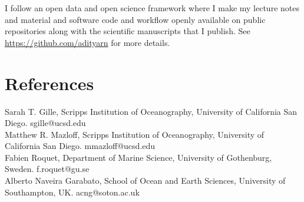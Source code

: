 \documentclass[12pt, a4paper]{article}
\newcommand{\numbers}[1]{\marginnote{\small #1}}
\begin{document}
I follow an open data and open science framework where I make my lecture notes and material and software code and workflow openly available on public repositories along with the scientific manuscripts that I publish. See \url{https://github.com/adityarn} for more details.


\section*{References}

\numbers{■} Sarah T. Gille, Scripps Institution of Oceanography, University of California San Diego. sgille@ucsd.edu\\
\numbers{■} Matthew R. Mazloff, Scripps Institution of Oceanography, University of California San Diego. mmazloff@ucsd.edu\\
\numbers{■} Fabien Roquet, Department of Marine Science, University of Gothenburg, Sweden. f.roquet@gu.se\\
\numbers{■} Alberto Naveira Garabato, School of Ocean and Earth Sciences, University of Southampton, UK. acng@soton.ac.uk\\
\end{document}
